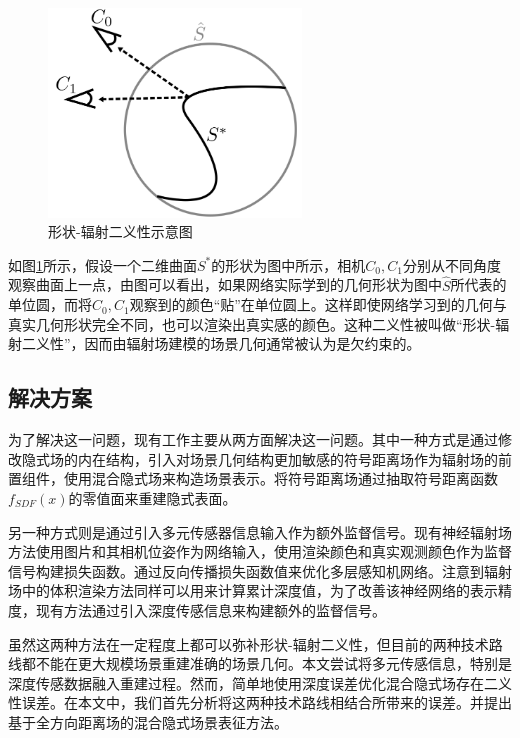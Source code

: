 \begin{figure}[ht]
    \centering
    \includegraphics[width=0.6\textwidth]{undergraduate-thesis/images/omni-nerf/shape-radiance ambiguity.png}
    \caption{形状-辐射二义性示意图\cite{zhang_nerf_2020}}
    \label{fig:omni-nerf shape-radiance ambiguity}
\end{figure}

如图\ref{fig:omni-nerf shape-radiance ambiguity}所示，假设一个二维曲面$S^*$的形状为图中所示，相机$C_0, C_1$分别从不同角度观察曲面上一点，由图可以看出，如果网络实际学到的几何形状为图中$\hat{S}$所代表的单位圆，而将$C_0, C_1$观察到的颜色“贴”在单位圆上。这样即使网络学习到的几何与真实几何形状完全不同，也可以渲染出真实感的颜色。这种二义性被叫做“形状-辐射二义性”\cite{zhang_nerf_2020}，因而由辐射场建模的场景几何通常被认为是欠约束的。

\subsection{解决方案}

为了解决这一问题，现有工作主要从两方面解决这一问题。其中一种方式是通过修改隐式场的内在结构，引入对场景几何结构更加敏感的符号距离场作为辐射场的前置组件，使用混合隐式场来构造场景表示。将符号距离场通过抽取符号距离函数$f_{SDF}(x)$的零值面来重建隐式表面。

另一种方式则是通过引入多元传感器信息输入作为额外监督信号。现有神经辐射场方法使用图片和其相机位姿作为网络输入，使用渲染颜色和真实观测颜色作为监督信号构建损失函数。通过反向传播损失函数值来优化多层感知机网络。注意到辐射场中的体积渲染方法同样可以用来计算累计深度值，为了改善该神经网络的表示精度，现有方法通过引入深度传感信息来构建额外的监督信号\cite{deng_depth-supervised_2022, roessle_dense_2022, azinovic_neural_2022}。

虽然这两种方法在一定程度上都可以弥补形状-辐射二义性，但目前的两种技术路线都不能在更大规模场景重建准确的场景几何。本文尝试将多元传感信息，特别是深度传感数据融入重建过程。然而，简单地使用深度误差优化混合隐式场存在二义性误差。在本文中，我们首先分析将这两种技术路线相结合所带来的误差。并提出基于全方向距离场的混合隐式场景表征方法。

